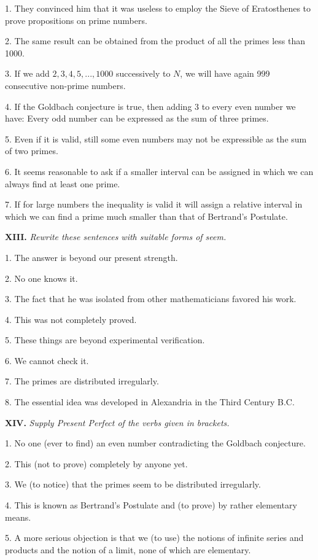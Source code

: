 \documentclass[a4paper]{article}
\newcommand{\ETask}[2]{\medskip\par\textbf{#1.} \textit{#2}\par}
\begin{document}
1. They convinced him that it was useless to employ the Sieve of Eratosthenes to prove propositions on prime numbers.

2. The same result can be obtained from the product of all the primes less than 1000.

3. If we add $2,3,4,5,...,1000$ successively to $N$, we will have again 999 consecutive non-prime numbers.

4. If the Goldbach conjecture is true, then adding 3 to every even number we have: Every odd number can be expressed as the
sum of three primes.

5. Even if it is valid, still some even numbers may not be expressible as the sum of two primes.

6. It seems reasonable to ask if a smaller interval can be assigned in which we can always find at least one prime.

7. If for large numbers the inequality is valid it will assign a relative interval in which we can find a prime much smaller
than that of Bertrand's Postulate.

\ETask{XIII}{Rewrite these sentences with suitable forms of seem.}

1. The answer is beyond our present strength.

2. No one knows it.

3. The fact that he was isolated from other mathematicians favored his work.

4. This was not completely proved.

5. These things are beyond experimental verification.

6. We cannot check it.

7. The primes are distributed irregularly.

8. The essential idea was developed in Alexandria in the Third Century B.C.

\ETask{XIV}{Supply Present Perfect of the verbs given in brackets.}

1. No one (ever to find) an even number contradicting the Goldbach conjecture.

2. This (not to prove) completely by anyone yet.

3. We (to notice) that the primes seem to be distributed irregularly.

4. This is known as Bertrand's Postulate and (to prove) by rather elementary means.

5. A more serious objection is that we (to use) the notions of infinite series and products and the notion of a limit,
none of which are elementary.
\end{document}
